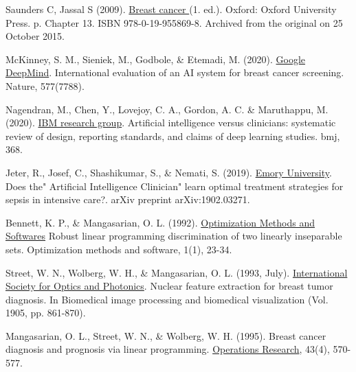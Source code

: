 \documentclass[12pt]{article}
\numberwithin{equation}{section}
\begin{document}
\begin{flushleft}
\begin{thebibliography}{9}
 \label{Intro_2}
Saunders C, Jassal S (2009). \href{https://oregon.providence.org/forms-and-information/a/ask-an-expert-breast-cancer-growth-rate/#:~:text=With%20most%20breast%20cancers%2C%20each,for%20two%20to%20five%20years.}{Breast cancer } (1. ed.). Oxford: Oxford University Press. p. Chapter 13. ISBN 978-0-19-955869-8. Archived from the original on 25 October 2015.

 \label{Intro_3}
McKinney, S. M., Sieniek, M., Godbole,  \& Etemadi, M. (2020). \href{https://www.nature.com/articles/s41586-019-1799-6.epdf?sharing_token=taEAaI9FuO1v2_qjjgBLCNRgN0jAjWel9jnR3ZoTv0M5zwPVx5jT4z_z-YkUZTBTbM27UWphyoF6vHoR667kKgqCi8GNWj2oxgaEK9QGM_IurywsmLuy55SQ7zLhN1w2PP8xyLENTDrX9WSxGhhJyStKcU7vGDuf95dNqUay8vJNKHD0cUHo3S9xHdNCr5bD0uvYtVx23S0ZlTUQ2yrso9HXWCVUi58098rFD6Xl7bkoJt1i9l60yGUzDsjpE7Ro&tracking_referrer=www.bbc.com}{Google DeepMind}. International evaluation of an AI system for breast cancer screening. Nature, 577(7788).

 \label{Intro_4}
Nagendran, M., Chen, Y., Lovejoy, C. A., Gordon, A. C. \& Maruthappu, M. (2020). \href{https://www.bmj.com/content/368/bmj.m689}{IBM research group}. Artificial intelligence versus clinicians: systematic review of design, reporting standards, and claims of deep learning studies. bmj, 368. 

 \label{Intro_5}
Jeter, R., Josef, C., Shashikumar, S., \& Nemati, S. (2019). \href{https://arxiv.org/abs/1902.03271}{Emory University}. Does the" Artificial Intelligence Clinician" learn optimal treatment strategies for sepsis in intensive care?. arXiv preprint arXiv:1902.03271.


 \label{BG_1}
Bennett, K. P., \& Mangasarian, O. L. (1992). \href{https://www.tandfonline.com/doi/abs/10.1080/10556789208805504}{Optimization Methods and Softwares} Robust linear programming discrimination of two linearly inseparable sets. Optimization methods and software, 1(1), 23-34.


 \label{BG_2}
Street, W. N., Wolberg, W. H., \& Mangasarian, O. L. (1993, July). \href{https://www.spiedigitallibrary.org/conference-proceedings-of-spie/1905/0000/Nuclear-feature-extraction-for-breast-tumor-diagnosis/10.1117/12.148698.short?SSO=1}{International Society for Optics and Photonics}. Nuclear feature extraction for breast tumor diagnosis. In Biomedical image processing and biomedical visualization (Vol. 1905, pp. 861-870). 


 \label{BG_3}
Mangasarian, O. L., Street, W. N., \& Wolberg, W. H. (1995). Breast cancer diagnosis and prognosis via linear programming. \href{https://pubsonline.informs.org/doi/abs/10.1287/opre.43.4.570}{Operations Research}, 43(4), 570-577.



\end{thebibliography}
\end{flushleft}
\end{document}
